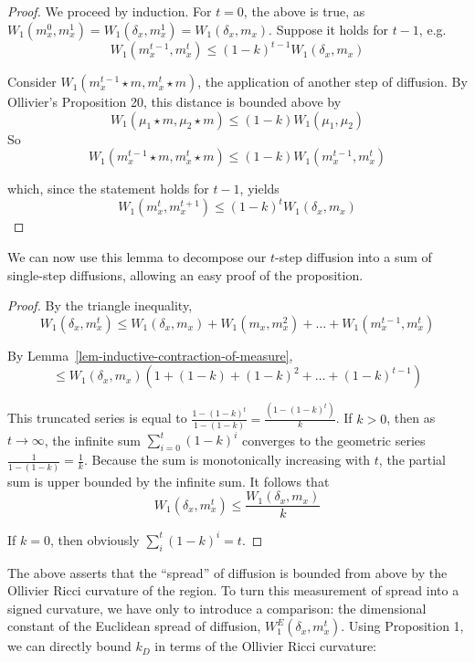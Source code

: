\documentclass[
  letterpaper,
  DIV=11,
  numbers=noendperiod]{scrartcl}
\theoremstyle{plain}
\theoremstyle{plain}
\theoremstyle{definition}
\theoremstyle{plain}
\theoremstyle{definition}
\theoremstyle{remark}
\begin{document}
\begin{proof}
We proceed by induction. For \(t=0\), the above is true, as
\(W_{1}(m_{x}^0, m_{x}^{1}) =W_{1}(\delta_x, m_{x}^{1}) = W_1\left(\delta_x,m_x\right)\).
Suppose it holds for \(t-1\), e.g. \[
W_1\left(m_x^{t-1}, m_x^{t}\right) \leq(1-k)^{t-1} W_1\left(\delta_x,m_x\right)
\]

Consider \(W_1\left(m_x^{t-1}\star m, m_x^{t}\star m\right)\), the
application of another step of diffusion. By Ollivier's Proposition 20,
this distance is bounded above by \[
W_1\left(\mu_1 \star m, \mu_2 \star m\right) \leq(1-k) W_1\left(\mu_1, \mu_2\right)
\] So \[
W_1\left(m_x^{t-1}\star m, m_x^{t}\star m\right) \leq  (1-k)W_1\left(m_x^{t-1}, m_x^{t}\right)
\]

which, since the statement holds for \(t-1\), yields \[
W_1\left(m_x^t, m_x^{t+1}\right) \leq(1-k)^t W_1\left(\delta_x,m_x\right)
\]
\end{proof}

We can now use this lemma to decompose our \(t\)-step diffusion into a
sum of single-step diffusions, allowing an easy proof of the
proposition.

\begin{proof}
By the triangle inequality, \[
W_{1}(\delta_{x},m_{x}^t) \leq W_1\left(\delta_x,m_x\right) + W_{1}(m_{x},m_{x}^2) + \dots + W_{1}(m_{x}^{t-1}, m_{x}^t)
\]

By Lemma~\ref{lem-inductive-contraction-of-measure}, \[
\leq W_1\left(\delta_x,m_x\right)\left(1+(1-k)+(1-k)^2+\ldots+(1-k)^{t-1}\right)
\]

This truncated series is equal to
\(\frac{1-(1-k)^t}{1-(1-k)} = \frac{(1-(1-k)^t)}{k}\). If \(k>0\), then
as \(t \to \infty\), the infinite sum \(\sum_{i=0}^t (1-k)^i\) converges
to the geometric series \(\frac{1}{1-(1-k)} = \frac{1}{k}\). Because the
sum is monotonically increasing with \(t\), the partial sum is upper
bounded by the infinite sum. It follows that \[
W_{1}(\delta_{x},m_{x}^t) \leq \frac{W_1\left(\delta_x,m_x\right)}{k}
\]

If \(k=0\), then obviously \(\sum_{i}^t (1-k)^i = t\).
\end{proof}

The above asserts that the ``spread'' of diffusion is bounded from above
by the Ollivier Ricci curvature of the region. To turn this measurement
of spread into a signed curvature, we have only to introduce a
comparison: the dimensional constant of the Euclidean spread of
diffusion, \(W_{1}^E(\delta_{x},m_{x}^t)\). Using Proposition 1, we can
directly bound \(k_{D}\) in terms of the Ollivier Ricci curvature:
\end{document}
